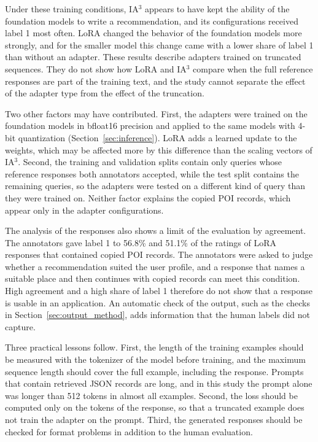 \documentclass[journal,article,submit,pdftex,moreauthors]{Definitions/mdpi}
\begin{document}
Under these training conditions, IA$^3$ appears to have kept the ability of the foundation models to write a recommendation, and its configurations received label 1 most often. LoRA changed the behavior of the foundation models more strongly, and for the smaller model this change came with a lower share of label 1 than without an adapter. These results describe adapters trained on truncated sequences. They do not show how LoRA and IA$^3$ compare when the full reference responses are part of the training text, and the study cannot separate the effect of the adapter type from the effect of the truncation.

Two other factors may have contributed. First, the adapters were trained on the foundation models in bfloat16 precision and applied to the same models with 4-bit quantization (Section~\ref{sec:inference}). LoRA adds a learned update to the weights, which may be affected more by this difference than the scaling vectors of IA$^3$. Second, the training and validation splits contain only queries whose reference responses both annotators accepted, while the test split contains the remaining queries, so the adapters were tested on a different kind of query than they were trained on. Neither factor explains the copied POI records, which appear only in the adapter configurations.

The analysis of the responses also shows a limit of the evaluation by agreement. The annotators gave label 1 to 56.8\% and 51.1\% of the ratings of LoRA responses that contained copied POI records. The annotators were asked to judge whether a recommendation suited the user profile, and a response that names a suitable place and then continues with copied records can meet this condition. High agreement and a high share of label 1 therefore do not show that a response is usable in an application. An automatic check of the output, such as the checks in Section~\ref{sec:output_method}, adds information that the human labels did not capture.

Three practical lessons follow. First, the length of the training examples should be measured with the tokenizer of the model before training, and the maximum sequence length should cover the full example, including the response. Prompts that contain retrieved JSON records are long, and in this study the prompt alone was longer than 512 tokens in almost all examples. Second, the loss should be computed only on the tokens of the response, so that a truncated example does not train the adapter on the prompt. Third, the generated responses should be checked for format problems in addition to the human evaluation.
\end{document}
